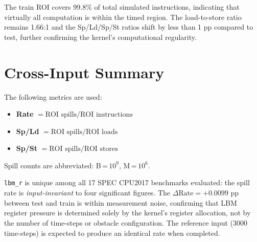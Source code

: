 \documentclass[conference]{IEEEtran}
\begin{document}
The train ROI covers 99.8\% of total simulated instructions, indicating
that virtually all computation is within the timed region.  The
load-to-store ratio remains 1.66:1 and the Sp/Ld/Sp/St ratios shift
by less than 1 pp compared to test, further confirming the kernel's
computational regularity.

\section*{Cross-Input Summary}

The following metrics are used:
\begin{itemize}
    \item \textbf{Rate} $= \text{ROI spills} / \text{ROI instructions}$
    \item \textbf{Sp/Ld} $= \text{ROI spills} / \text{ROI loads}$
    \item \textbf{Sp/St} $= \text{ROI spills} / \text{ROI stores}$
\end{itemize}
Spill counts are abbreviated: B\,=\,$10^9$, M\,=\,$10^6$.

\begin{table}[H]
\centering
\caption{519.lbm\_r --- All Runs Across Input Sizes}
\label{tab:summary}
\end{table}

\texttt{lbm\_r} is unique among all 17 SPEC CPU2017 benchmarks evaluated:
the spill rate is \emph{input-invariant} to four significant figures.
The $\Delta\text{Rate} = +0.0099$ pp between test and train is within
measurement noise, confirming that LBM register pressure is determined
solely by the kernel's register allocation, not by the number of
time-steps or obstacle configuration.  The reference input (3000
time-steps) is expected to produce an identical rate when completed.
\end{document}
